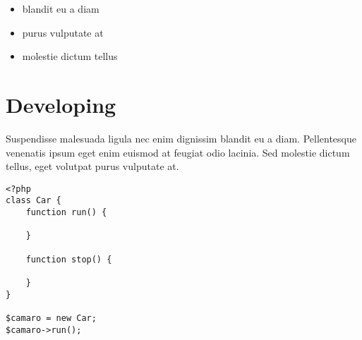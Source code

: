 \begin{itemize}
\item blandit eu a diam
\item purus vulputate at
\item molestie dictum tellus
\end{itemize}

\section{Developing}
Suspendisse malesuada ligula nec enim dignissim blandit eu a diam. Pellentesque venenatis ipsum eget enim euismod at feugiat odio lacinia. Sed molestie dictum tellus, eget volutpat purus vulputate at.

\begin{lstlisting}
<?php
class Car {
	function run() {
	
	}
	
	function stop() {
	
	}
}

$camaro = new Car;
$camaro->run();

\end{lstlisting}

